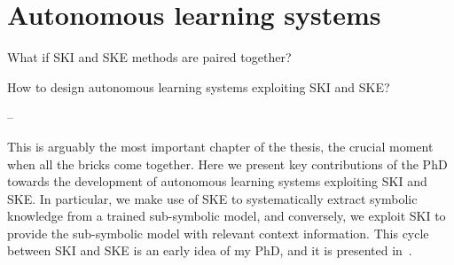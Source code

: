 
\chapter{Autonomous learning systems}
\label{ch:autonomous-learning-systems}

\begin{flushright}
\begin{minipage}{0.5\textwidth}
    What if \gls{SKI} and \gls{SKE} methods are paired together?

    How to design autonomous learning systems exploiting \gls{SKI} and \gls{SKE}?

    -- \textbf{}
\end{minipage}
\end{flushright}

\minitoc


This is arguably the most important chapter of the thesis, the crucial moment when all the bricks come together.
%
Here we present key contributions of the PhD towards the development of autonomous learning systems exploiting \gls{SKI} and \gls{SKE}.
%
In particular, we make use of \gls{SKE} to systematically extract symbolic knowledge from a trained sub-symbolic model, and conversely, we exploit \gls{SKI} to provide the sub-symbolic model with relevant context information.
%
This cycle between \gls{SKI} and \gls{SKE} is an early idea of my PhD, and it is presented in~.


